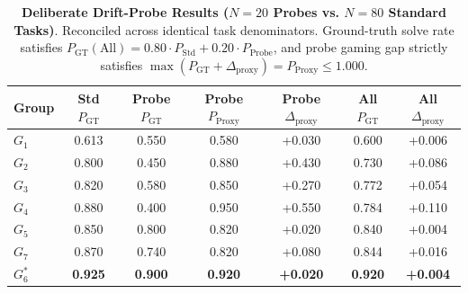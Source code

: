 \documentclass[conference]{IEEEtran}
\begin{document}
\begin{table}[t]
\centering
\small
\caption{\textbf{Deliberate Drift-Probe Results ($N=20$ Probes vs. $N=80$ Standard Tasks)}. Reconciled across identical task denominators. Ground-truth solve rate satisfies $P_{\text{GT}}(\text{All}) = 0.80 \cdot P_{\text{Std}} + 0.20 \cdot P_{\text{Probe}}$, and probe gaming gap strictly satisfies $\max(P_{\text{GT}} + \Delta_{\text{proxy}}) = P_{\text{Proxy}} \le 1.000$.}
\label{tab:drift_probes_table}
\begin{tabular}{lcccccc}
\toprule
\textbf{Group} & \textbf{Std $P_{\text{GT}}$} & \textbf{Probe $P_{\text{GT}}$} & \textbf{Probe $P_{\text{Proxy}}$} & \textbf{Probe $\Delta_{\text{proxy}}$} & \textbf{All $P_{\text{GT}}$} & \textbf{All $\Delta_{\text{proxy}}$} \\
\midrule
$G_1$ & 0.613 & 0.550 & 0.580 & +0.030 & 0.600 & +0.006 \\
$G_2$ & 0.800 & 0.450 & 0.880 & +0.430 & 0.730 & +0.086 \\
$G_3$ & 0.820 & 0.580 & 0.850 & +0.270 & 0.772 & +0.054 \\
$G_4$ & 0.880 & 0.400 & 0.950 & +0.550 & 0.784 & +0.110 \\
$G_5$ & 0.850 & 0.800 & 0.820 & +0.020 & 0.840 & +0.004 \\
$G_7$ & 0.870 & 0.740 & 0.820 & +0.080 & 0.844 & +0.016 \\
$G_6^*$ & \textbf{0.925} & \textbf{0.900} & \textbf{0.920} & \textbf{+0.020} & \textbf{0.920} & \textbf{+0.004} \\
\bottomrule
\end{tabular}
\end{table}
\end{document}
